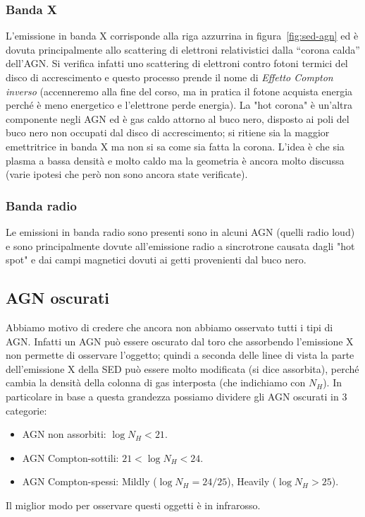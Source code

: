  \subsubsection{Banda X}
L'emissione in banda X corrisponde alla riga azzurrina in figura~\ref{fig:sed-agn} ed è dovuta principalmente allo scattering di elettroni relativistici dalla “corona calda” dell'AGN. Si verifica infatti uno scattering di elettroni contro fotoni termici del disco di accrescimento e questo processo prende il nome di \emph{Effetto Compton inverso} (accenneremo alla fine del corso, ma in pratica il fotone acquista energia perché è meno energetico e l'elettrone perde energia). La "hot corona" è un’altra componente negli AGN ed è gas caldo attorno al buco nero, disposto ai poli del buco nero non occupati dal disco di accrescimento; si ritiene sia la maggior emettritrice in banda X ma non si sa come sia fatta la corona. L’idea è che sia plasma a bassa densità e molto caldo ma la geometria è ancora molto discussa (varie ipotesi che però non sono ancora state verificate).

\subsubsection{Banda radio}
Le emissioni in banda radio sono presenti sono in alcuni AGN (quelli radio loud) e sono principalmente dovute all'emissione radio a sincrotrone causata dagli "hot spot" e dai campi magnetici dovuti ai getti provenienti dal buco nero.
 
\subsection{AGN oscurati}
Abbiamo motivo di credere che ancora non abbiamo osservato tutti i tipi di AGN. Infatti un AGN può essere oscurato dal toro che assorbendo l'emissione X non permette di osservare l'oggetto; quindi a seconda delle linee di vista la parte dell'emissione X della SED può essere molto modificata (si dice assorbita), perché cambia la densità della colonna di gas interposta (che indichiamo con $N_H$). In particolare in base a questa grandezza possiamo dividere gli AGN oscurati in 3 categorie:
\begin{itemize}
    \item AGN non assorbiti: $\log N_H < 21$.
    \item AGN Compton-sottili: $21 < \log N_H < 24$.
    \item AGN Compton-spessi: Mildly ($\log N_H = 24/25$), Heavily ($\log N_H > 25$).
\end{itemize}
Il miglior modo per osservare questi oggetti è in infrarosso. 

